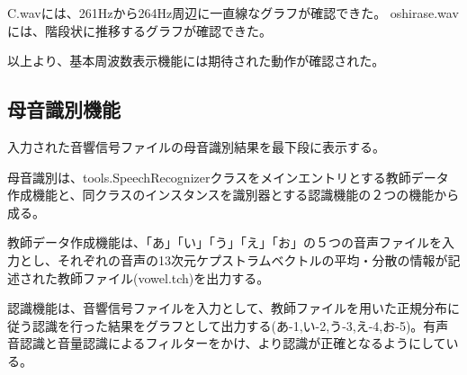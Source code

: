 \documentclass[a4j]{jarticle}
\begin{document}
C.wavには、261Hzから264Hz周辺に一直線なグラフが確認できた。
oshirase.wavには、階段状に推移するグラフが確認できた。

以上より、基本周波数表示機能には期待された動作が確認された。

\subsection{母音識別機能}
入力された音響信号ファイルの母音識別結果を最下段に表示する。

母音識別は、tools.SpeechRecognizerクラスをメインエントリとする教師データ作成機能と、同クラスのインスタンスを識別器とする認識機能の２つの機能から成る。

教師データ作成機能は、「あ」「い」「う」「え」「お」の５つの音声ファイルを入力とし、それぞれの音声の13次元ケプストラムベクトルの平均・分散の情報が記述された教師ファイル(vowel.tch)を出力する。

認識機能は、音響信号ファイルを入力として、教師ファイルを用いた正規分布に従う認識を行った結果をグラフとして出力する(あ-1,い-2,う-3,え-4,お-5)。有声音認識と音量認識によるフィルターをかけ、より認識が正確となるようにしている。
\end{document}
